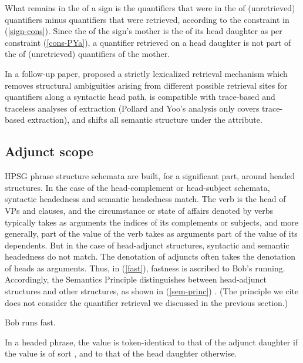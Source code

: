 \documentclass[output=paper
	        ,collection
	        ,collectionchapter
 	        ,biblatex
                ,babelshorthands
                ,newtxmath
                ,draftmode
                ,colorlinks, citecolor=brown
]{langscibook}
\begin{document}
What remains in the  of a sign is the quantifiers that were in the  of (unretrieved) quantifiers minus quantifiers that were retrieved, according to the  constraint in (\ref{sign-cons}). Since the  of  the sign's mother is the  of its head daughter as per constraint (\ref{cons-PYa}), a quantifier retrieved on a head daughter is not part of the  of (unretrieved) quantifiers of the mother. 

In a follow-up paper, \citet{Przepiorkowski1998b} proposed a strictly lexicalized retrieval mechanism which removes structural ambiguities arising from different possible retrieval sites for quantifiers along a syntactic head path, is compatible with trace-based and traceless analyses of extraction (Pollard and Yoo's analysis only covers trace-based extraction), and shifts all semantic structure under the  attribute.



\subsection{Adjunct scope}
\label{semantics-sec-adjunct-scope}

HPSG phrase structure schemata are  built, for a significant part, around headed structures. In the case of the head-complement or head-subject schemata, syntactic headedness and semantic headedness match. The verb is the head of VPs and clauses, and the circumstance or state of affairs denoted by verbs typically takes as arguments the indices of its complements or subjects, and more generally, part of the  value of the verb takes as arguments part of the  value of its dependents. But in the case of head-adjunct structures, syntactic and semantic headedness do not match. The denotation of adjuncts often takes the denotation of heads as arguments. Thus, in (\ref{fast}), fastness is ascribed to Bob's running. Accordingly, the Semantics Principle distinguishes between head-adjunct structures and other structures, as shown in (\ref{sem-princ}) \citep[56]{PollardandSag1994}. (The principle we cite does not consider the quantifier retrieval we discussed in the previous section.)

\begin{exe}
\ex\label{fast} Bob runs fast.
\end{exe} 

\begin{exe}
\ex\label{sem-princ}
In a headed phrase, the  value is token-identical to that of the adjunct daughter if the  value is of sort , and to that of the head daughter otherwise.
\end{exe}
\end{document}
